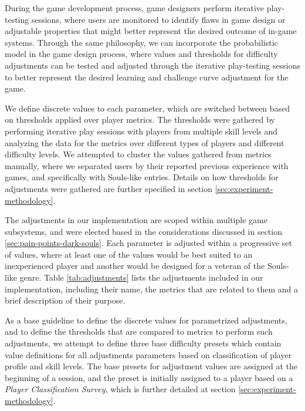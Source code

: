 During the game development process, game designers perform iterative play-testing sessions, where users are monitored to identify flaws in game design or adjustable properties that might better represent the desired outcome of in-game systems. Through the same philosophy, we can incorporate the probabilistic model in the game design process, where values and thresholds for difficulty adjustments can be tested and adjusted through the iterative play-testing sessions to better represent the desired learning and challenge curve adjustment for the game.

We define discrete values to each parameter, which are switched between based on thresholds applied over player metrics. The thresholds were gathered by performing iterative play sessions with players from multiple skill levels and analyzing the data for the metrics over different types of players and different difficulty levels. We attempted to cluster the values gathered from metrics manually, where we separated users by their reported previous experience with games, and specifically with Souls-like entries. Details on how thresholds for adjustments were gathered are further specified in section \ref{sec:experiment-methodology}.

The adjustments in our implementation are scoped within multiple game subsystems, and were elected based in the considerations discussed in section \ref{sec:pain-points-dark-souls}. Each parameter is adjusted within a progressive set of values, where at least one of the values would be best suited to an inexperienced player and another would be designed for a veteran of the Souls-like genre. Table \ref{tab:adjustments} lists the adjustments included in our implementation, including their name, the metrics that are related to them and a brief description of their purpose.



As a base guideline to define the discrete values for parametrized adjustments, and to define the thresholds that are compared to metrics to perform such adjustments, we attempt to define three base difficulty presets which contain value definitions for all adjustments parameters based on classification of player profile and skill levels. The base presets for adjustment values are assigned at the beginning of a session, and the preset is initially assigned to a player based on a \emph{Player Classification Survey}, which is further detailed at section \ref{sec:experiment-methodology}.

